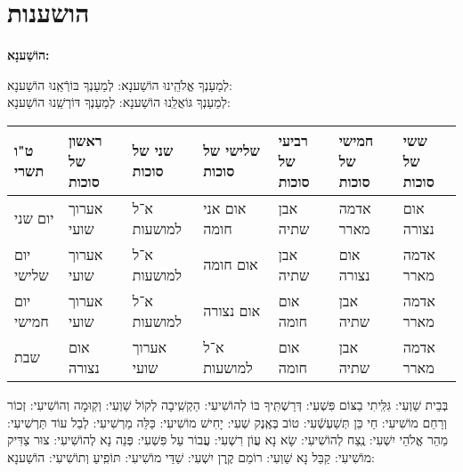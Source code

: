 \documentclass[twoside, openany, parskip=half, 11pt]{book}
\begin{document}


\chapter[הושענות]{ הושענות }
\label{hoshanos}


\begin{Large}
\textbf{
הוֹשַׁענָא:
}
 \end{Large}
 
  
 לְמַעַנְךָ אֱלֹהֵֽינוּ הוֹשַׁענָא: לְמַעַנְךָ בּוֹרְֿאֵֽנוּ הוֹשַׁענָא:\\
לְמַעַנְךָ גּוֹאֲלֵֽנוּ הוֹשַׁענָא: לְמַעַנְךָ דּוֹרְשֵֽׁנוּ הוֹשַׁענָא:

\begin{tiny}
\begin{tabular}{>{\centering\arraybackslash}m{}||>{\centering\arraybackslash}m{}|>{\centering\arraybackslash}m{}|>{\centering\arraybackslash}m{}|>{\centering\arraybackslash}m{}|>{\centering\arraybackslash}m{}|>{\centering\arraybackslash}m{}}
ט"ו תשרי & ראשון של סוכות & שני של סוכות & שלישי של סוכות & רביעי של סוכות & חמישי של סוכות & ששי של סוכות \\
\hline \hline
יום שני & אערוך שועי & א־ל למושעות & אום אני חומה & אבן שתיה & אדמה מארר & אום נצורה\\ \hline
יום שלישי & אערוך שועי & א־ל למושעות & אום חומה & אבן שתיה & אום נצורה & אדמה מארר \\ \hline
יום חמישי & אערוך שועי & א־ל למושעות & אום נצורה & אום חומה & אבן שתיה & אדמה מארר\\ \hline
שבת & אום נצורה & אערוך שועי & א־ל למושעות & אום חומה & אבן שתיה & אדמה מארר 
\end{tabular}

\end{tiny}


בְּבֵית שַׁוְעִי: גִּלִּֽיתִי בַצּוֹם פִּשְׁעִי: דְּרַשְׁתִּֽיךָ בּוֹ לְהוֹשִׁיעִי: הַקְשִֽׁיבָה לְקוֹל שַׁוְעִי: וְקֽוּמָה וְהוֹשִׁיעִי: זְכוֹר וְרַחֵם מוֹשִׁיעִי: חַי כֵּן תְּשַׁעְשְֿׁעִי: טוֹב בְּאֶֽנֶק שְׁעִי: יָחִישׁ מוֹשִׁיעִי: כַּלֵּה מַרְשִׁיעִי: לְבַל עוֹד תַּרְשִׁיעִי: מַהֵר אֱלֹהֵי יִשְׁעִי: נֶֽצַח לְהוֹשִׁיעִי: שָׂא נָא עֲוֹן רִשְׁעִי: עֲבוֹר עַל פִּשְׁעִי: פְּנֵה נָא לְהוֹשִׁיעִי: צוּר צַדִּיק מוֹשִׁיעִי: קַבֵּל נָא שַׁוְעִי: רוֹמֵם קֶֽרֶן יִשְׁעִי:
 שַׁדַּי מוֹשִׁיעִי: תּוֹפִֽיעַ וְתוֹשִׁיעִי: הוֹשַׁענָא:

\end{document}

